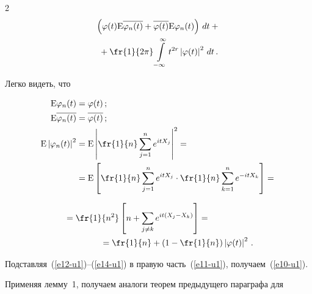 \begin{multicols}{2}
\begin{multline}
\left(\varphi(t){\rm E}\overline{\varphi_n(t)}+

\overline{\varphi(t)}{\rm E}\varphi_n(t)\right)\,dt+{}\\

{}+

\fr{1}{2\pi}\int\limits_{-\infty}^\infty t^{2r}\left\vert\varphi(t)\right\vert^2\,dt\,.

\label{e11-u1}

\end{multline}

Легко видеть, что

\begin{align}

{\rm E}\varphi_n(t)&=\varphi(t)\,;\label{e12-u1}\\

{\rm E}\overline{\varphi_n(t)}&=\overline{\varphi(t)}\,;\label{e13-u1}\\

{\rm E}\left\vert\varphi_n(t)\right\vert^2&=

{\rm E}\left\vert\fr{1}{n}\sum\limits_{j=1}^ne^{itX_j}\right\vert^2

={}\notag\\

&{}={\rm E}\left[\fr{1}{n}\sum\limits_{j=1}^ne^{itX_j}\cdot\fr{1}{n}

\sum\limits_{k=1}^ne^{-itX_k}\right]={}\notag

\end{align}



\noindent

\begin{align}

&{}=\fr{1}{n^2}\left[n+\sum\limits_{j\not=k}e^{it(X_j-X_k)}\right]={}\notag\\

&\hspace*{15mm}{}=

\fr{1}{n}+\left(1-\fr{1}{n}\right)\left\vert\varphi(t)\right\vert^2\,.

\label{e14-u1}

\end{align}

Подставляя~(\ref{e12-u1})--(\ref{e14-u1}) в правую часть~(\ref{e11-u1}), получаем~(\ref{e10-u1}).



\smallskip



Применяя лемму~1, получаем аналоги теорем предыдущего параграфа для


\end{multicols}
